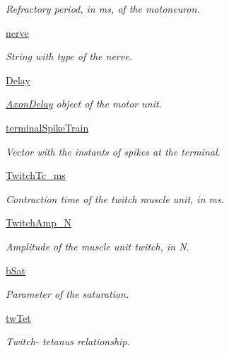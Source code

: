 \begin{DoxyCompactItemize}
\begin{DoxyCompactList}\small\item\em Refractory period, in ms, of the motoneuron. \end{DoxyCompactList}\item 
\hyperlink{class_motor_unit_1_1_motor_unit_a754ee6b88fc2a09899da9f9b13bfbf59}{nerve}
\begin{DoxyCompactList}\small\item\em String with type of the nerve. \end{DoxyCompactList}\item 
\hyperlink{class_motor_unit_1_1_motor_unit_abe82ffa1e293d10225b67870a962eab8}{Delay}
\begin{DoxyCompactList}\small\item\em \hyperlink{namespace_axon_delay}{Axon\+Delay} object of the motor unit. \end{DoxyCompactList}\item 
\hyperlink{class_motor_unit_1_1_motor_unit_a2e33990aaab69454943aa00db6b8d2eb}{terminal\+Spike\+Train}
\begin{DoxyCompactList}\small\item\em Vector with the instants of spikes at the terminal. \end{DoxyCompactList}\item 
\hyperlink{class_motor_unit_1_1_motor_unit_a083581c89ebb964e58721667307dd2bc}{Twitch\+Tc\+\_\+ms}
\begin{DoxyCompactList}\small\item\em Contraction time of the twitch muscle unit, in ms. \end{DoxyCompactList}\item 
\hyperlink{class_motor_unit_1_1_motor_unit_ad14af870eb3dd7468041853f2c6e8cab}{Twitch\+Amp\+\_\+N}
\begin{DoxyCompactList}\small\item\em Amplitude of the muscle unit twitch, in N. \end{DoxyCompactList}\item 
\hyperlink{class_motor_unit_1_1_motor_unit_a2256c241b36e0181e3530e6f791545a0}{b\+Sat}
\begin{DoxyCompactList}\small\item\em Parameter of the saturation. \end{DoxyCompactList}\item 
\hyperlink{class_motor_unit_1_1_motor_unit_a2a466c5f2f798901c1c438f9d57c2221}{tw\+Tet}
\begin{DoxyCompactList}\small\item\em Twitch-\/ tetanus relationship. \end{DoxyCompactList}\end{DoxyCompactItemize}


